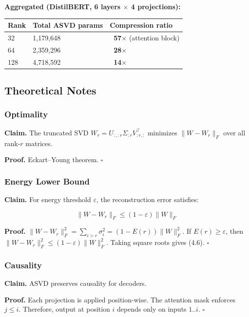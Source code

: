 \textbf{Aggregated (DistilBERT, 6 layers $\times$ 4 projections):}

\begin{table}[H]
\centering
\small
\begin{tabular}{lll}
\toprule
\textbf{Rank} & \textbf{Total ASVD params} & \textbf{Compression ratio} \\
\midrule
32 & 1,179,648 & \textbf{~57$\times$} (attention block) \\
64 & 2,359,296 & \textbf{~28$\times$} \\
128 & 4,718,592 & \textbf{~14$\times$} \\
\bottomrule
\end{tabular}
\end{table}

\subsection{Theoretical Notes}

\subsubsection{Optimality}

\textbf{Claim.} The truncated SVD $W_r = U_{:, :r} \Sigma_{:r} V_{:r, :}^\top$ 
minimizes $\|W - W_r\|_F$ over all rank-$r$ matrices.

\textbf{Proof.} Eckart--Young theorem. $\square$

\subsubsection{Energy Lower Bound}

\textbf{Claim.} For energy threshold $\varepsilon$, the reconstruction error 
satisfies:

\[
\|W - W_r\|_F \leq (1 - \varepsilon) \|W\|_F
\]

\textbf{Proof.} $\|W - W_r\|_F^2 = \sum_{i > r} \sigma_i^2 = (1 - E(r)) \|W\|_F^2$. 
If $E(r) \geq \varepsilon$, then $\|W - W_r\|_F^2 \leq (1 - \varepsilon) \|W\|_F^2$. 
Taking square roots gives (4.6). $\square$

\subsubsection{Causality}

\textbf{Claim.} ASVD preserves causality for decoders.

\textbf{Proof.} Each projection is applied position-wise. The attention mask 
enforces $j \leq i$. Therefore, output at position $i$ depends only on 
inputs $1..i$. $\square$

